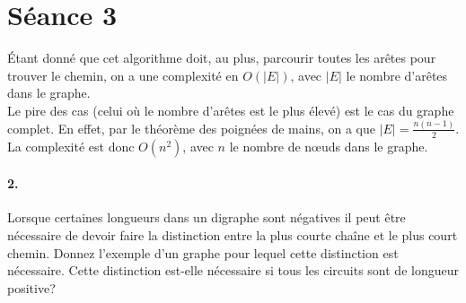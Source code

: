 %
%

\section{Séance 3}

\begin{solution}
	Étant donné que cet algorithme doit, au plus, parcourir toutes les arêtes pour trouver le chemin, on a une complexité en $O(\vert E \vert)$, avec $\vert E \vert$ le nombre d'arêtes dans le graphe.\\

	Le pire des cas (celui où le nombre d'arêtes est le plus élevé) est le cas du graphe complet. En effet, par le théorème des poignées de mains, on a que $\vert E \vert = \frac{n(n-1)}{2}$. La complexité est donc $O(n^2)$, avec $n$ le nombre de nœuds dans le graphe.
\end{solution}

\paragraph{2. } Lorsque certaines longueurs dans un digraphe sont négatives il peut être nécessaire de devoir faire la distinction entre la plus courte chaîne et le plus court chemin. Donnez l'exemple d'un graphe pour lequel cette distinction est nécessaire. Cette distinction est-elle nécessaire si tous les circuits sont de longueur positive?


